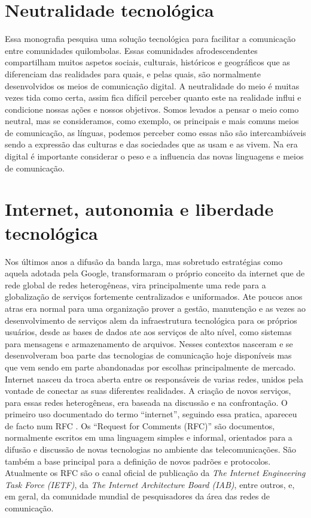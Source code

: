 \section{Neutralidade tecnológica}
Essa monografia pesquisa uma solução tecnológica para facilitar a
comunicação entre comunidades quilombolas. Essas comunidades
afrodescendentes compartilham muitos aspetos sociais, culturais,
históricos e geográficos que as diferenciam das realidades para quais,
e pelas quais, são normalmente desenvolvidos os meios de comunicação
digital. A neutralidade do meio é muitas vezes tida como certa, assim
fica difícil perceber quanto este na realidade influi e condicione
nossas ações e nossos objetivos. Somos levados a pensar o meio como
neutral, mas se consideramos, como exemplo, os principais e mais comuns
meios de comunicação, as línguas, podemos perceber como essas não são
intercambiáveis sendo a expressão das culturas e das sociedades que as
usam e as vivem. Na era digital é importante considerar o peso e a
influencia das novas linguagens e meios de comunicação. 

\section{Internet, autonomia e liberdade tecnológica}
Nos últimos anos a difusão da banda larga, mas sobretudo estratégias
como aquela adotada pela Google, transformaram o próprio conceito da
internet que de rede global de redes heterogêneas, vira principalmente
uma rede para a globalização de serviços fortemente centralizados e
uniformados. Ate poucos anos atras era normal para uma organização
prover a gestão, manutenção e as vezes ao desenvolvimento de serviços
alem da infraestrutura tecnológica para os próprios usuários, desde as
bases de dados ate aos serviços de alto nível, como sistemas para
mensagens e armazenamento de arquivos. Nesses contextos nasceram e se
desenvolveram boa parte das tecnologias de comunicação hoje
disponíveis mas que vem sendo em parte abandonadas por escolhas
principalmente de mercado. Internet nasceu da troca aberta entre os
responsáveis de varias redes, unidos pela vontade de conectar as suas
diferentes realidades. A criação de novos serviços, para essas redes
heterogêneas, era baseada na discussão e na confrontação. O primeiro
uso documentado do termo ``internet'', seguindo essa pratica, apareceu
de facto num RFC \citep{RFC675}. Os ``Request for Comments (RFC)'' são
documentos, normalmente escritos em uma linguagem simples e informal,
orientados para a difusão e discussão de novas tecnologias no ambiente
das telecomunicações. São também a base principal para a definição de
novos padrões e protocolos. Atualmente os RFC são o canal oficial de
publicação da \emph{The Internet Engineering Task Force (IETF)}, da
\emph{The Internet Architecture Board (IAB)}, entre outros, e, em
geral, da comunidade mundial de pesquisadores da área das redes de
comunicação.



